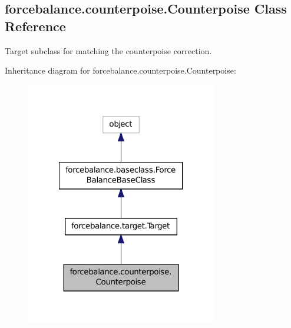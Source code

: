 \hypertarget{classforcebalance_1_1counterpoise_1_1Counterpoise}{\subsection{forcebalance.\-counterpoise.\-Counterpoise Class Reference}
\label{classforcebalance_1_1counterpoise_1_1Counterpoise}
}


Target subclass for matching the counterpoise correction.  




Inheritance diagram for forcebalance.\-counterpoise.\-Counterpoise\-:
\nopagebreak
\begin{figure}[H]
\begin{center}
\leavevmode
\includegraphics[width=236pt]{classforcebalance_1_1counterpoise_1_1Counterpoise__inherit__graph}
\end{center}
\end{figure}


